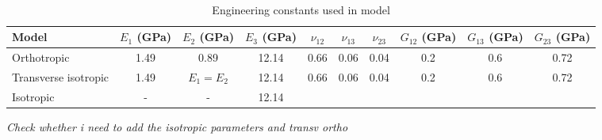 \documentclass[review]{elsarticle}
\begin{document}
\begin{description}

\item[]
\begin{table}[ht]\
\caption{Engineering constants used in model} %
\centering %
\begin{tabular}{l c c c c c c c c c} %
\hline\hline %
Model & $E_{1}$ (GPa) & $E_{2}$ (GPa) & $E_{3}$ (GPa) & $\nu_{12}$ & $\nu_{13}$
& $\nu_{23}$ & $G_{12}$ (GPa) & $G_{13}$ (GPa) & $G_{23}$ (GPa) \\ %

\hline %
Orthotropic & 1.49 & 0.89 & 12.14 & 0.66 & 0.06 & 0.04 & 0.2 & 0.6 & 0.72 \\
Transverse isotropic & 1.49 & $E_1=E_2$ & 12.14 & 0.66 & 0.06 & 0.04 & 0.2 &
 0.6 & 0.72\\
Isotropic & - & - & 12.14 \\
 [1ex] %
\hline %
\end{tabular}
\label{table:nonlin} %
\end{table}

\it{\color{red}Check whether i need to add the isotropic parameters and transv
ortho}

\end{description}



\pagebreak


\end{document}
